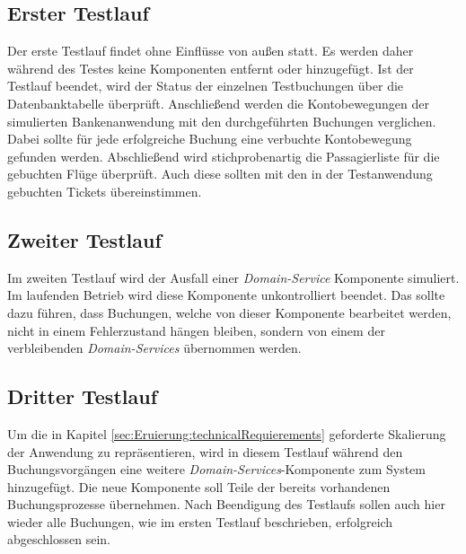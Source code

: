 \subsection{Erster Testlauf}
Der erste Testlauf findet ohne Einflüsse von außen statt. Es werden daher während des Testes keine Komponenten entfernt oder hinzugefügt. Ist der Testlauf beendet, wird der Status der einzelnen Testbuchungen über die Datenbanktabelle überprüft. Anschließend werden die Kontobewegungen der simulierten Bankenanwendung mit den durchgeführten Buchungen verglichen. Dabei sollte für jede erfolgreiche Buchung eine verbuchte Kontobewegung gefunden werden. Abschließend wird stichprobenartig die Passagierliste für die gebuchten Flüge überprüft. Auch diese sollten mit den in der Testanwendung gebuchten Tickets übereinstimmen. \\

\subsection{Zweiter Testlauf}
Im zweiten Testlauf wird der Ausfall einer \textit{Domain-Service} Komponente simuliert. Im laufenden Betrieb wird diese Komponente unkontrolliert beendet. Das sollte dazu führen, dass Buchungen, welche von dieser Komponente bearbeitet werden, nicht in einem Fehlerzustand hängen bleiben, sondern von einem der verbleibenden \textit{Domain-Services} übernommen werden. 

\subsection{Dritter Testlauf}
Um die in Kapitel \ref{sec:Eruierung:technicalRequierements} geforderte Skalierung der Anwendung zu repräsentieren, wird in diesem Testlauf während den Buchungsvorgängen eine weitere \textit{Domain-Services}-Komponente zum System hinzugefügt. Die neue Komponente soll Teile der bereits vorhandenen Buchungsprozesse übernehmen. Nach Beendigung des Testlaufs sollen auch hier wieder alle Buchungen, wie im ersten Testlauf beschrieben, erfolgreich abgeschlossen sein. 

